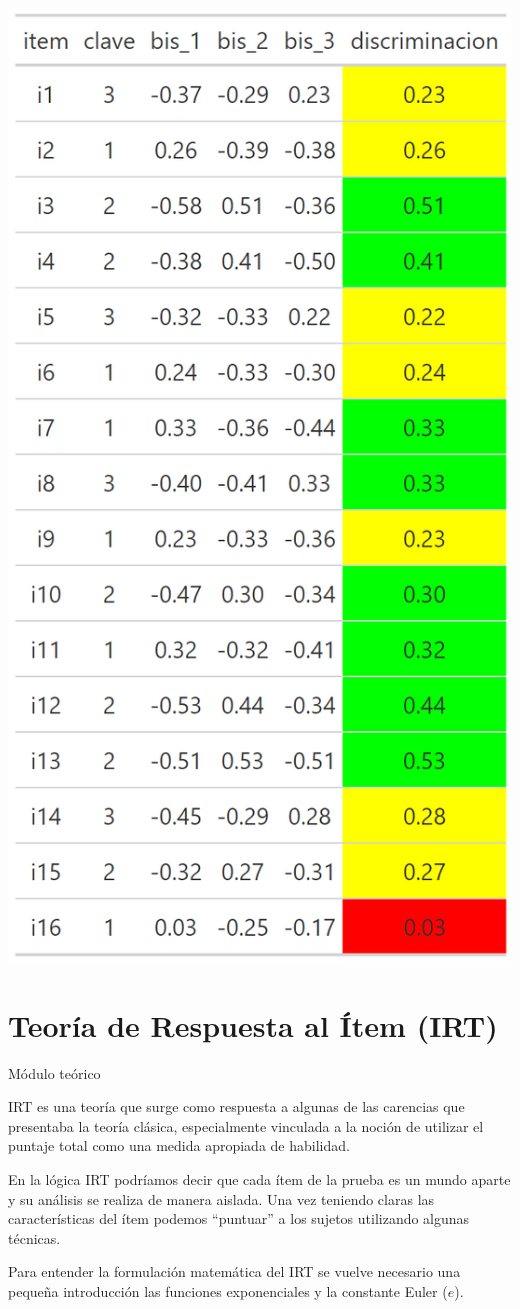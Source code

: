 \documentclass[
  letterpaper,
  DIV=11,
  numbers=noendperiod]{scrreprt}
\begin{document}
\begin{center}
\includegraphics[width=0.6\linewidth,height=\textheight,keepaspectratio]{images/teoria_clasica_disc_all.png}
\end{center}

\chapter{Teoría de Respuesta al Ítem
(IRT)}\label{teoruxeda-de-respuesta-al-uxedtem-irt}

Módulo teórico

\hfill\break

IRT es una teoría que surge como respuesta a algunas de las carencias
que presentaba la teoría clásica, especialmente vinculada a la noción de
utilizar el puntaje total como una medida apropiada de habilidad.

En la lógica IRT podríamos decir que cada ítem de la prueba es un mundo
aparte y su análisis se realiza de manera aislada. Una vez teniendo
claras las características del ítem podemos ``puntuar'' a los sujetos
utilizando algunas técnicas.

Para entender la formulación matemática del IRT se vuelve necesario una
pequeña introducción las funciones exponenciales y la constante Euler
(\(e\)).
\end{document}
